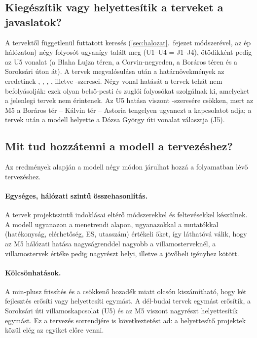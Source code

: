 \documentclass[12pt,a4paper]{article}
\theoremstyle{definition}
\theoremstyle{remark}
\begin{document}
\subsection{Kiegészítik vagy helyettesítik a terveket a javaslatok?}

A tervektől függetlenül futtatott keresés (\ref{sec:halozat}.~fejezet
módszerével, az ép hálózaton) négy folyosót ugyanígy talált meg (U1--U4 =
J1--J4), ötödikként pedig az U5 \UNAMEE{} vonalat (a Blaha Lujza téren, a
Corvin-negyeden, a Boráros téren és a Soroksári úton át). A tervek
megvalósulása után a határnövekmények az eredetinek \INTUA, \INTUB, \INTUC,
\INTUD, illetve \INTUE-szeresei. Négy vonal hatását a tervek tehát nem
befolyásolják: ezek olyan belső-pesti és zuglói folyosókat szolgálnak ki,
amelyeket a jelenlegi tervek nem érintenek. Az U5 hatása viszont
\INTUE-szeresére csökken, mert az M5 a Boráros tér -- Kálvin tér -- Astoria
tengelyen ugyanezt a kapcsolatot adja; a tervek után a modell helyette a
Dózsa György úti vonalat választja (J5).

\subsection{Mit tud hozzátenni a modell a tervezéshez?}

Az eredmények alapján a modell négy módon járulhat hozzá a folyamatban lévő
tervezéshez.

\paragraph{Egységes, hálózati szintű összehasonlítás.}
A tervek projektszintű indoklásai eltérő módszerekkel és feltevésekkel
készülnek. A modell ugyanazon a menetrendi alapon, ugyanazokkal a mutatókkal
(hatékonyság, elérhetőség, ES, utasszám) értékeli őket, így láthatóvá válik,
hogy az M5 hálózati hatása nagyságrenddel nagyobb a villamosterveknél, a
villamostervek értéke pedig nagyrészt helyi, illetve a jövőbeli igényhez
kötött.

\paragraph{Kölcsönhatások.}
A min-plusz frissítés és a csökkenő hozadék miatt olcsón kiszámítható, hogy
két fejlesztés erősíti vagy helyettesíti egymást. A dél-budai tervek
egymást erősítik, a Soroksári úti villamoskapcsolat (U5) és az M5 viszont
nagyrészt helyettesítik egymást. Ez a tervezés sorrendjére is
következtetést ad: a helyettesítő projektek közül elég az egyiket előre
venni.
\end{document}
